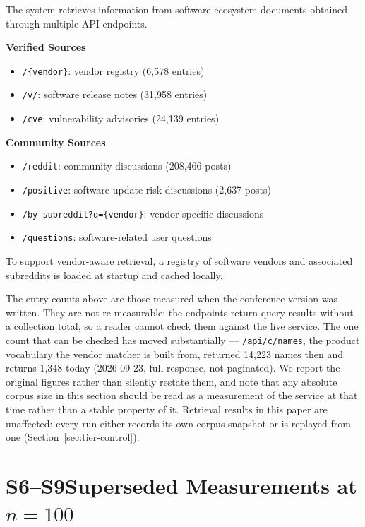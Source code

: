 \documentclass[acmsmall,anonymous,screen]{acmart}
\begin{document}
The system retrieves information from software ecosystem documents
obtained through multiple API endpoints.

\textbf{Verified Sources}
\begin{itemize}
\item \texttt{/\{vendor\}}: vendor registry (6,578 entries)
\item \texttt{/v/}: software release notes (31,958 entries)
\item \texttt{/cve}: vulnerability advisories (24,139 entries)
\end{itemize}

\textbf{Community Sources}
\begin{itemize}
\item \texttt{/reddit}: community discussions (208,466 posts)
\item \texttt{/positive}: software update risk discussions (2,637 posts)
\item \texttt{/by-subreddit?q=\{vendor\}}: vendor-specific discussions
\item \texttt{/questions}: software-related user questions
\end{itemize}

To support vendor-aware retrieval, a registry of software vendors and
associated subreddits is loaded at startup and cached locally.

The entry counts above are those measured when the conference version was
written. They are not re-measurable: the endpoints return query results
without a collection total, so a reader cannot check them against the live
service. The one count that can be checked has moved substantially ---
\texttt{/api/c/names}, the product vocabulary the vendor matcher is built
from, returned 14,223 names then and returns 1,348 today (2026-09-23, full
response, not paginated). We report the original figures rather than silently
restate them, and note that any absolute corpus size in this section should be
read as a measurement of the service at that time rather than a stable
property of it. Retrieval results in this paper are unaffected: every run
either records its own corpus snapshot or is replayed from one
(Section~\ref{sec:tier-control}).



\section*{S6--S9\quad Superseded Measurements at $n=100$}
\renewcommand{\thetable}{S\arabic{table}}
\setcounter{table}{5}
\end{document}
